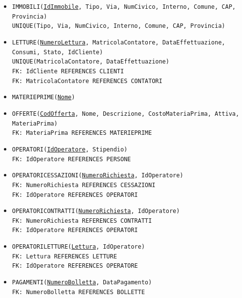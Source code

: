 \documentclass[a4paper,12pt]{report}
\begin{document}
\begin{itemize}
    \item \texttt{IMMOBILI(\underline{IdImmobile}, Tipo, Via, NumCivico, Interno, Comune, CAP, Provincia) \\
    UNIQUE(Tipo, Via, NumCivico, Interno, Comune, CAP, Provincia)}
    
    \item \texttt{LETTURE(\underline{NumeroLettura}, MatricolaContatore, DataEffettuazione, Consumi, Stato, IdCliente) \\
    UNIQUE(MatricolaContatore, DataEffettuazione) \\
    FK: IdCliente REFERENCES CLIENTI \\
    FK: MatricolaContatore REFERENCES CONTATORI}
    
    \item \texttt{MATERIE\textunderscore PRIME(\underline{Nome})}
    
    \item \texttt{OFFERTE(\underline{CodOfferta}, Nome, Descrizione, CostoMateriaPrima, Attiva, MateriaPrima) \\
    FK: MateriaPrima REFERENCES MATERIE\textunderscore PRIME}
    
    \item \texttt{OPERATORI(\underline{IdOperatore}, Stipendio) \\
    FK: IdOperatore REFERENCES PERSONE}
    
    \item \texttt{OPERATORI\textunderscore CESSAZIONI(\underline{NumeroRichiesta}, IdOperatore) \\
    FK: NumeroRichiesta REFERENCES CESSAZIONI \\
    FK: IdOperatore REFERENCES OPERATORI}
    
    \item \texttt{OPERATORI\textunderscore CONTRATTI(\underline{NumeroRichiesta}, IdOperatore) \\
    FK: NumeroRichiesta REFERENCES CONTRATTI \\
    FK: IdOperatore REFERENCES OPERATORI}
    
    \item \texttt{OPERATORI\textunderscore LETTURE(\underline{Lettura}, IdOperatore) \\
    FK: Lettura REFERENCES LETTURE \\
    FK: IdOperatore REFERENCES OPERATORE}
    
    \item \texttt{PAGAMENTI(\underline{NumeroBolletta}, DataPagamento) \\
    FK: NumeroBolletta REFERENCES BOLLETTE}
    

\end{itemize}
\end{document}

